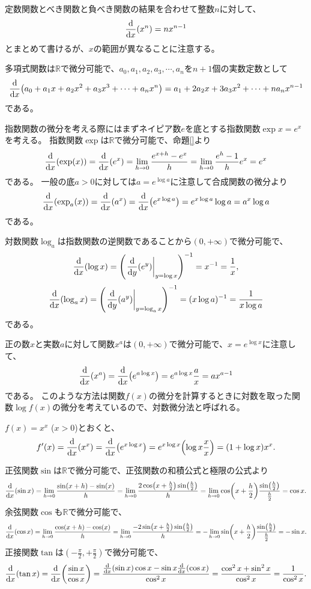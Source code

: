 定数関数とべき関数と負べき関数の結果を合わせて整数$n$に対して、
$$
\dv{x}(x^n) = n x^{n-1}
$$
とまとめて書けるが、$x$の範囲が異なることに注意する。

多項式関数は$\mathbb{R}$で微分可能で、$a_0, a_1, a_2, a_3, \cdots, a_n$を$n+1$個の実数定数として
$$
\dv{x}(a_0+a_1 x+a_2 x^2+a_3 x^3+\cdots+a_n x^n) = a_1+2 a_2 x+3 a_3 x^2+\cdots+n a_n x^{n-1}
$$
である。

指数関数の微分を考える際にはまずネイピア数$e$を底とする指数関数$\exp x = e^x$を考える。
指数関数$\exp$は$\mathbb{R}$で微分可能で、命題\ref{}より
$$
\dv{x}(\exp(x)) = \dv{x}(e^x) = \lim_{h \to 0}\frac{e^{x+h}-e^x}{h} = \lim_{h \to 0}\frac{e^h-1}{h}e^x = e^x
$$
である。
一般の底$a > 0$に対しては$a = e^{\log a}$に注意して合成関数の微分より
$$
\dv{x}(\exp_a(x)) = \dv{x}(a^x) = \dv{x}(e^{x\log a}) = e^{x\log a}\log a = a^x\log a
$$
である。

対数関数$\log_a$は指数関数の逆関数であることから$(0, +\infty)$で微分可能で、
$$
\dv{x}(\log x) = \qty(\eval{\dv{y}(e^y)}_{y = \log x})^{-1} = x^{-1} = \frac{1}{x},
$$
$$
\dv{x}(\log_a x) = \qty(\eval{\dv{y}(a^y)}_{y = \log_a x})^{-1} = (x\log a)^{-1} = \frac{1}{x\log a}
$$
である。

正の数$x$と実数$a$に対して関数$x^a$は$(0, +\infty)$で微分可能で、$x = e^{\log x}$に注意して、
$$
\dv{x}(x^a) = \dv{x}(e^{a\log x}) = e^{a\log x}\frac{a}{x} = a x^{a-1}
$$
である。
このような方法は関数$f(x)$の微分を計算するときに対数を取った関数$\log f(x)$の微分を考えているので、対数微分法と呼ばれる。

\begin{example}
$f(x) = x^x$ ($x > 0$)とおくと、
$$
f'(x) = \dv{x}(x^x) = \dv{x}(e^{x\log x}) = e^{x\log x}\qty(\log x\frac{x}{x}) = (1+\log x)x^x.
$$
\end{example}

正弦関数$\sin$は$\mathbb{R}$で微分可能で、正弦関数の和積公式と極限の公式より
$$
\dv{x}(\sin x)
= \lim_{h \to 0}\frac{\sin(x+h)-\sin(x)}{h}
= \lim_{h \to 0}\frac{2\cos(x+\frac{h}{2})\sin(\frac{h}{2})}{h}
= \lim_{h \to 0}\cos(x+\frac{h}{2})\frac{\sin(\frac{h}{2})}{\frac{h}{2}}
= \cos x.
$$
余弦関数$\cos$も$\mathbb{R}$で微分可能で、
$$
\dv{x}(\cos x)
= \lim_{h \to 0}\frac{\cos(x+h)-\cos(x)}{h}
= \lim_{h \to 0}\frac{-2\sin(x+\frac{h}{2})\sin(\frac{h}{2})}{h}
= -\lim_{h \to 0}\sin(x+\frac{h}{2})\frac{\sin(\frac{h}{2})}{\frac{h}{2}}
= -\sin x.
$$
正接関数$\tan$は$(-\frac{\pi}{2}, +\frac{\pi}{2})$で微分可能で、
$$
\dv{x}(\tan x)
= \dv{x}\qty(\frac{\sin x}{\cos x})
= \frac{\dv{x}(\sin x)\cos x-\sin x\dv{x}(\cos x)}{\cos^2 x}
= \frac{\cos^2 x+\sin^2 x}{\cos^2 x}
= \frac{1}{\cos^2 x}.
$$

